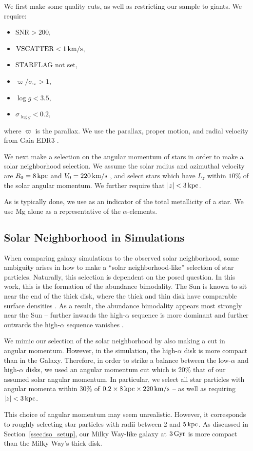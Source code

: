 We first make some quality cuts, as well as restricting our sample to giants. We require:
\begin{itemize}[noitemsep]
    \item $\textrm{SNR} > 200$,
    \item $\textrm{VSCATTER} < 1\,\textrm{km}/\textrm{s}$,
    \item STARFLAG not set,
    \item $\varpi/\sigma_{\varpi} > 1$,
    \item $\log{g} < 3.5$,
    \item $\sigma_{\log{g}} < 0.2$,
\end{itemize}
where $\varpi$ is the parallax. We use the parallax, proper motion, and radial velocity from Gaia EDR3 \citep{2016AA...595A...1G,2021AA...649A...1G,2021AA...649A...2L,2021AA...653A.160S}.

We next make a selection on the angular momentum of stars in order to make a solar neighborhood selection. We assume the solar radius and azimuthal velocity are $R_0=8\,\textrm{kpc}$ and $V_0=220\,\textrm{km}/\textrm{s}$ \citep{2016ARA&A..54..529B}, and select stars which have $L_z$ within $10\%$ of the solar angular momentum. We further require that $\left|z\right| < 3\,\textrm{kpc}$.

As is typically done, we use \FeH{} as an indicator of the total metallicity of a star. We use Mg alone as a representative of the $\alpha$-elements.

\subsection{Solar Neighborhood in Simulations}\label{ssec:solarneigh}
When comparing galaxy simulations to the observed solar neighborhood, some ambiguity arises in how to make a ``solar neighborhood-like'' selection of star particles. Naturally, this selection is dependent on the posed question. In this work, this is the formation of the abundance bimodality. The Sun is known to sit near the end of the thick disk, where the thick and thin disk have comparable surface densities \citep[the ratio of thick-to-thin is $\sim12\%$][]{2016ARA&A..54..529B}. As a result, the abundance bimodality appears most strongly near the Sun -- further inwards the high-$\alpha$ sequence is more dominant and further outwards the high-$\alpha$ sequence vanishes \citep[e.g.,][]{2015ApJ...808..132H}.

We mimic our selection of the solar neighborhood by also making a cut in angular momentum. However, in the simulation, the high-$\alpha$ disk is more compact than in the Galaxy. Therefore, in order to strike a balance between the low-$\alpha$ and high-$\alpha$ disks, we used an angular momentum cut which is $20\%$ that of our assumed solar angular momentum. In particular, we select all star particles with angular momenta within $30\%$ of $0.2\times8\,\textrm{kpc}\times220\,\textrm{km}/\textrm{s}$ -- as well as requiring $\left| z \right| < 3\,\textrm{kpc}$.

This choice of angular momentum may seem unrealistic. However, it corresponds to roughly selecting star particles with radii between $2$ and $5\,\textrm{kpc}$. As discussed in Section~\ref{ssec:iso_setup}, our Milky Way-like galaxy at $3\,\textrm{Gyr}$ is more compact than the Milky Way's thick disk.
